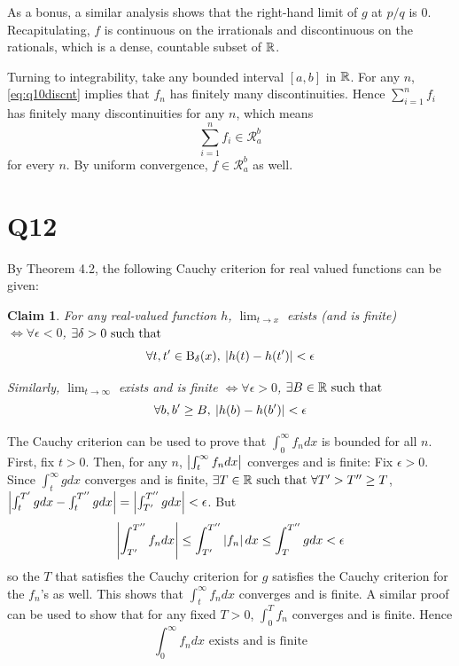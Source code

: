 \documentclass[12pt]{article}
\newtheorem{claim}{Claim}
\begin{document}
As a bonus, a similar analysis shows that the right-hand limit of $g$ at $p / q$ is 0. 
Recapitulating, $f$ is continuous on the irrationals and discontinuous on the rationals, which is a dense, countable subset of $\mathbb{R}$.  

Turning to integrability, take any bounded interval $[a, b]$ in $\mathbb{R}$. 
For any $n$, \eqref{eq:q10discnt} implies that $f_n$ has finitely many discontinuities. 
Hence $\sum_{i = 1}^{n} f_i$ has finitely many discontinuities for any $n$, which means 
$$\sum_{i = 1}^{n} f_i \in \mathscr{R}_{a}^{b}$$ 
for every $n$. 
By uniform convergence, $f \in \mathscr{R}_{a}^{b}$ as well. 

\section*{Q12}
\setcounter{equation}{0}
By Theorem 4.2, the following Cauchy criterion for real valued functions can be given: 
\begin{claim}
  For any real-valued function $h$, $\lim_{t \rightarrow x}$ exists (and is finite) $\iff \forall \epsilon < 0$, $\exists \delta > 0 \text{ such that }$ 
  $$\forall t, t' \in \text{B}_{\delta}(x), \: \left|h(t) - h(t')\right| < \epsilon$$ 
  
  Similarly, $\lim_{t \rightarrow \infty}$ exists and is finite $\iff \forall \epsilon > 0$, $\exists B \in \mathbb{R} \text{ such that }$
  $$\forall b, b' \geq B, \: \left|h(b) - h(b')\right| < \epsilon$$   
\end{claim} 

The Cauchy criterion can be used to prove that $\int_{0}^{\infty} f_n dx$ is bounded for all $n$. 
First, fix $t > 0$.
Then, for any $n$, $\left|\int_{t}^{\infty} f_n dx\right|$ converges and is finite: 
Fix $\epsilon > 0$. 
Since $\int_{t}^{\infty} g dx$ converges and is finite, $\exists T \in \mathbb{R} \text{ such that } \forall T' > T'' \geq T$, $\left|\int_{t}^{T'} g dx - \int_{t}^{T''} g dx\right| = \left|\int_{T'}^{T''} g dx\right| < \epsilon$.
But
$$\left|\int_{T'}^{T''} f_n dx\right| \leq \int_{T'}^{T''} \left|f_n\right| dx \leq \int_{T}^{T''} g dx < \epsilon$$
so the $T$ that satisfies the Cauchy criterion for $g$ satisfies the Cauchy criterion for the $f_n$'s as well.
This shows that $\int_{t}^{\infty} f_n dx$ converges and is finite. 
A similar proof can be used to show that for any fixed $T > 0$, $\int_{0}^{T} f_n$ converges and is finite. 
Hence 
$$\int_{0}^{\infty} f_n dx \text{ exists and is finite}$$
\end{document}
